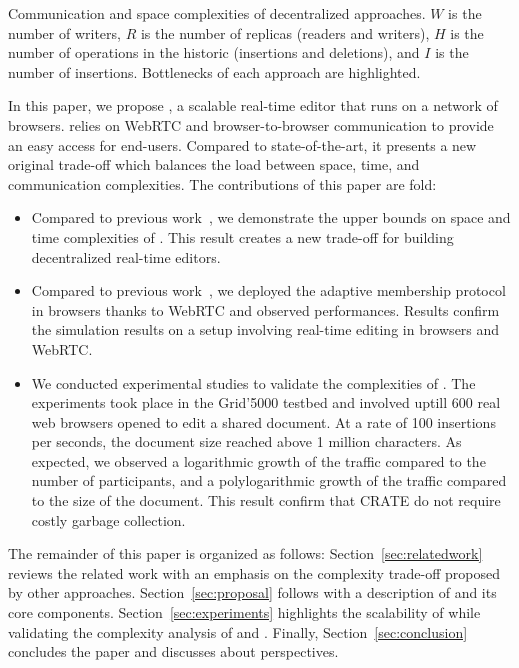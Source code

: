 \begin{table*}[t]
  \centering
  
  \caption{\label{table:complexities}
    Communication and space complexities of decentralized approaches.
    $W$ is the number of writers, 
    $R$ is the number of replicas (readers and writers),
    $H$ is the number of operations in the historic (insertions and deletions),
    and $I$ is the number of insertions.
    Bottlenecks of each approach are highlighted.}
\end{table*}


In this paper, we propose \CRATE, a scalable real-time editor that runs on a
network of browsers. \CRATE relies on WebRTC and browser-to-browser
communication to provide an easy access for end-users. Compared to
state-of-the-art, it presents a new original trade-off which balances the load
between space, time, and communication complexities. The contributions of this
paper are fold:
\begin{itemize}
\item Compared to previous work~\cite{nedelec2013lseq}, we demonstrate the upper
  bounds on space and time complexities of \LSEQ. This result creates
  a new trade-off for building decentralized real-time editors.
\item Compared to previous work~\cite{nedelec2015spray}, we deployed
  the \SPRAY adaptive membership protocol in browsers thanks to WebRTC
  and observed performances. Results confirm the simulation results on a
  setup involving real-time editing in browsers and WebRTC.
\item We conducted experimental studies to validate the complexities of
  \CRATE. The experiments took place in the Grid'5000 testbed and involved
  uptill $600$ real web browsers opened to edit a shared document. At a rate of
  100 insertions per seconds, the document size reached above 1 million
  characters. As expected, we observed a logarithmic growth of the traffic
  compared to the number of participants, and a polylogarithmic growth of the
  traffic compared to the size of the document. This result confirm
  that CRATE do not require costly garbage collection. 
\end{itemize}

The remainder of this paper is organized as follows:
Section~\ref{sec:relatedwork} reviews the related work with an emphasis on the
complexity trade-off proposed by other approaches. Section~\ref{sec:proposal}
follows with a description of \CRATE and its core
components. Section~\ref{sec:experiments} highlights the scalability of \CRATE
while validating the complexity analysis of \LSEQ and \SPRAY. Finally,
Section~\ref{sec:conclusion} concludes the paper and discusses about
perspectives.

